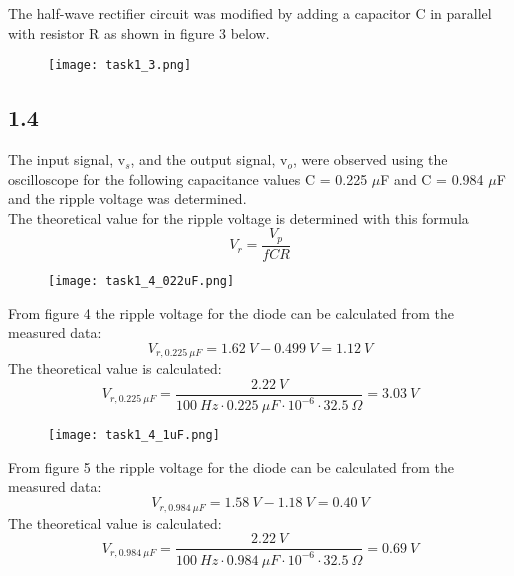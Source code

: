     The half-wave rectifier circuit was modified by adding a capacitor C in parallel with resistor R as shown in figure 3 below.

    \begin{figure}[h!]
        \centering
        \texttt{[image: task1\_3.png]}
    \end{figure}

\subsection*{1.4}
    
    The input signal, v$_s$, and the output signal, v$_o$, were observed using the oscilloscope for the following capacitance values C = 0.225 $\mu$F and C = 0.984 $\mu$F and the ripple voltage was determined.\\
    
    The theoretical value for the ripple voltage is determined with this formula $$ V_r = \dfrac{V_p}{fCR} $$
    
    \begin{figure}[h!]
        \centering
        \texttt{[image: task1\_4\_022uF.png]}
    \end{figure}
    
    From figure 4 the ripple voltage for the diode can be calculated from the measured data: $$ V_{r,0.225 \ \mu F} = 1.62 \ V - 0.499 \ V = 1.12 \ V $$
    The theoretical value is calculated: $$ V_{r,0.225 \ \mu F} = \dfrac{2.22 \ V}{100 \ Hz \cdot 0.225 \ \mu F \cdot 10^{-6} \cdot 32.5 \ \Omega} = 3.03 \ V $$

    \begin{figure}[h!]
        \centering
        \texttt{[image: task1\_4\_1uF.png]}
    \end{figure}
    
    From figure 5 the ripple voltage for the diode can be calculated from the measured data: $$V_{r,0.984 \ \mu F} = 1.58 \ V - 1.18 \ V = 0.40 \ V $$
    The theoretical value is calculated: $$ V_{r,0.984 \ \mu F} = \dfrac{2.22 \ V}{100 \ Hz \cdot 0.984 \ \mu F \cdot 10^{-6} \cdot 32.5 \ \Omega} = 0.69 \ V $$

